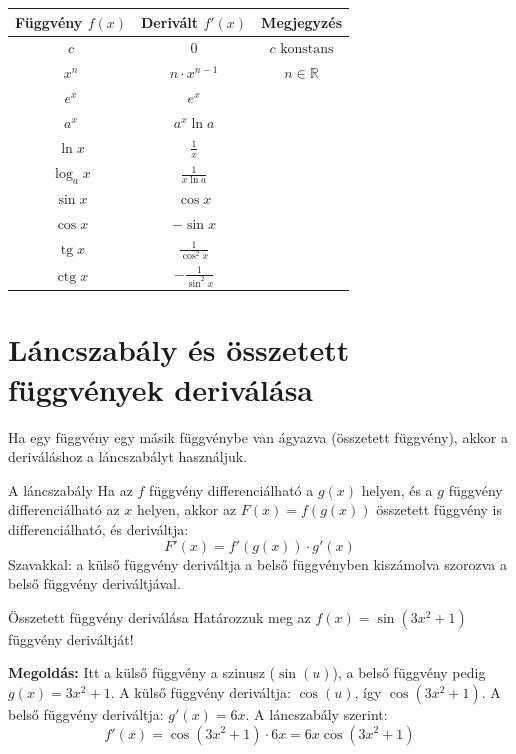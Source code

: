 \documentclass[11pt,a4paper]{article}
\begin{document}
\begin{center}
\renewcommand{\arraystretch}{1.8}
\begin{tabular}{|c|c|c|}
    \hline
    \textbf{Függvény } $f(x)$ & \textbf{Derivált } $f'(x)$ & \textbf{Megjegyzés} \\ \hline
    $c$ & $0$ & $c \text{ konstans}$ \\ \hline
    $x^n$ & $n \cdot x^{n-1}$ & $n \in \mathbb{R}$ \\ \hline
    $e^x$ & $e^x$ & \\ \hline
    $a^x$ & $a^x \ln a$ & \\ \hline
    $\ln x$ & $\frac{1}{x}$ & \\ \hline
    $\log_a x$ & $\frac{1}{x \ln a}$ & \\ \hline
    $\sin x$ & $\cos x$ & \\ \hline
    $\cos x$ & $-\sin x$ & \\ \hline
    $\operatorname{tg} x$ & $\frac{1}{\cos^2 x}$ & \\ \hline
    $\operatorname{ctg} x$ & $-\frac{1}{\sin^2 x}$ & \\ \hline
\end{tabular}
\end{center}

\section{Láncszabály és összetett függvények deriválása}
Ha egy függvény egy másik függvénybe van ágyazva (összetett függvény), akkor a deriváláshoz a láncszabályt használjuk.

\begin{defbox}{A láncszabály}
Ha az $f$ függvény differenciálható a $g(x)$ helyen, és a $g$ függvény differenciálható az $x$ helyen, akkor az $F(x) = f(g(x))$ összetett függvény is differenciálható, és deriváltja:
\[
F'(x) = f'(g(x)) \cdot g'(x)
\]
Szavakkal: a külső függvény deriváltja a belső függvényben kiszámolva szorozva a belső függvény deriváltjával.
\end{defbox}

\begin{examplebox}{Összetett függvény deriválása}
Határozzuk meg az $f(x) = \sin(3x^2 + 1)$ függvény deriváltját!
\vspace{0.2cm}

\textbf{Megoldás:}
Itt a külső függvény a szinusz ($\sin(u)$), a belső függvény pedig $g(x) = 3x^2 + 1$.
A külső függvény deriváltja: $\cos(u)$, így $\cos(3x^2 + 1)$.
A belső függvény deriváltja: $g'(x) = 6x$.
A láncszabály szerint:
\[
f'(x) = \cos(3x^2 + 1) \cdot 6x = 6x \cos(3x^2 + 1)
\]
\end{examplebox}
\end{document}
